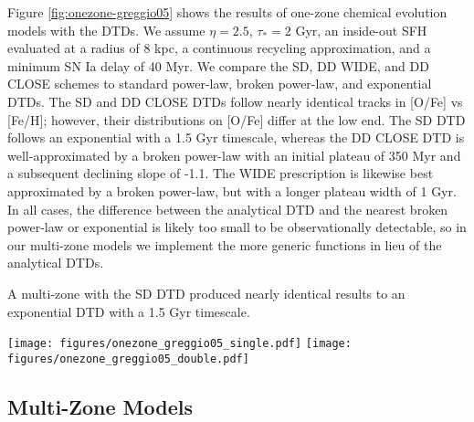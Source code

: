 \documentclass[twocolumn]{aastex631}
\begin{document}
Figure \ref{fig:onezone-greggio05} shows the results of one-zone chemical evolution models with the \citet{Greggio2005-AnalyticalRates} DTDs. We assume $\eta=2.5$, $\tau_*=2$ Gyr, an inside-out SFH evaluated at a radius of 8 kpc, a continuous recycling approximation, and a minimum SN Ia delay of 40 Myr. We compare the SD, DD WIDE, and DD CLOSE schemes to standard power-law, broken power-law, and exponential DTDs. The SD and DD CLOSE DTDs follow nearly identical tracks in [O/Fe] vs [Fe/H]; however, their distributions on [O/Fe] differ at the low end. The SD DTD follows an exponential with a 1.5 Gyr timescale, whereas the DD CLOSE DTD is well-approximated by a broken power-law with an initial plateau of 350 Myr and a subsequent declining slope of -1.1. The WIDE prescription is likewise best approximated by a broken power-law, but with a longer plateau width of 1 Gyr. In all cases, the difference between the analytical DTD and the nearest broken power-law or exponential is likely too small to be observationally detectable, so in our multi-zone models we implement the more generic functions in lieu of the analytical DTDs.

A multi-zone with the \citet{Greggio2005-AnalyticalRates} SD DTD produced nearly identical results to an exponential DTD with a 1.5 Gyr timescale.

\begin{figure*}
    \centering
    \texttt{[image: figures/onezone\_greggio05\_single.pdf]}
    \texttt{[image: figures/onezone\_greggio05\_double.pdf]}
    \caption{Abundance tracks and distributions from one-zone models with the analytical DTDs from \citet{Greggio2005-AnalyticalRates}. \textit{Left:} a comparison between the analytical SD DTD (solid curve), an exponential DTD with a 1.5 Gyr timescale (dashed curve), and a power-law DTD with a slope of -1.1 (dotted curve). \textit{Right:} a comparison between two different prescriptions for an analytical DD DTD (solid curves), power-law DTDs with an initial plateau of 1 Gyr and 350 Myr (dashed curves), and a power-law DTD with no plateau and a slope of -1.1 (dotted curve).}
    \label{fig:onezone-greggio05}
\end{figure*}

\subsection{Multi-Zone Models}
\label{sec:multizone-results}


\end{document}
